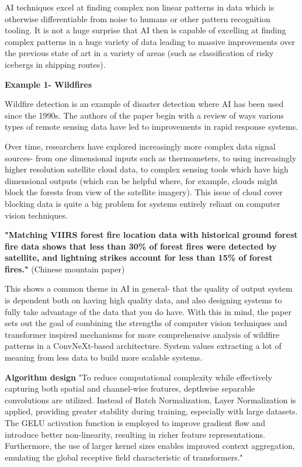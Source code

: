 \documentclass[conference,a4paper]{IEEEtran}
\begin{document}
AI techniques excel at finding complex non linear patterns in data which is otherwise differentiable from noise to humans or other pattern recognition tooling. It is not a huge surprise that AI then is capable of excelling at finding complex patterns in a huge variety of data leading to massive improvements over the previous state of art in a variety of areas (such as classification of risky icebergs in shipping routes).

\textbf{Example 1- Wildfires}

Wildfire detection is an example of disaster detection where AI has been used since the 1990s. The authors of the paper begin with a review of ways various types of remote sensing data have led to improvements in rapid response systems. 

Over time, researchers have explored increasingly more complex data signal sources- from one dimensional inputs such as thermometers, to using increasingly higher resolution satellite cloud data, to complex sensing tools which have high dimensional outputs (which can be helpful where, for example, clouds might block the forests from view of the satellite imagery). This issue of cloud cover blocking data is quite a big problem for systems entirely reliant on computer vision techniques. 

\textbf{"Matching VIIRS forest fire location data with historical ground forest fire data shows that less than 30\% of forest fires were detected by satellite, and lightning strikes account for less than 15\% of forest fires."}
(Chinese mountain paper)

This shows a common theme in AI in general- that the quality of output system is dependent both on having high quality data, and also  designing systems to fully take advantage of the data that you do have. With this in mind, the paper sets out the goal of combining the strengths of computer vision techniques and transformer inspired mechanisms for more comprehensive analysis of wildfire patterns in a ConvNeXt-based architecture. System values extracting a lot of meaning from less data to build more scalable systems.

\textbf{Algorithm design}
"To reduce computational complexity while effectively capturing both spatial and channel-wise features, depthwise separable convolutions are utilized. Instead of Batch Normalization, Layer Normalization is applied, providing greater stability during training, especially with large datasets. The GELU activation function is employed to improve gradient flow and introduce better non-linearity, resulting in richer feature representations. Furthermore, the use of larger kernel sizes enables improved context aggregation, emulating the global receptive field characteristic of transformers."
\end{document}

